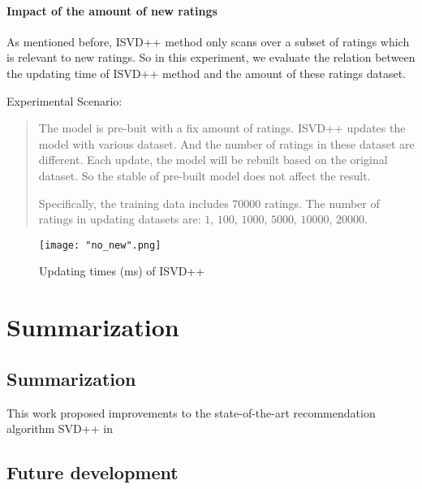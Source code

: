 \documentclass[oneside,13pt]{extreport}
\begin{document}
\subsubsection{Impact of the amount of new ratings}
As mentioned before, ISVD++ method only scans over a subset of ratings which is relevant to new ratings. So in this experiment, we evaluate the relation between the updating time of ISVD++ method and the amount of these ratings dataset.
 
Experimental Scenario: 
\begin{quote}
The model is pre-buit with a fix amount of ratings. ISVD++ updates the model with various dataset. And the number of ratings in these dataset are different. Each update, the model will be rebuilt based on the original dataset. So the stable of pre-built model does not affect the result. 

Specifically, the training data includes $70000$ ratings. The number of ratings in updating datasets are: $1$, $100$, $1000$, $5000$, $10000$, $20000$.
\end{quote}


\begin{figure}[h!]
    \centering
    \texttt{[image: "no\_new".png]} 
    \caption{Updating times (ms) of ISVD++}
    \label{fig:train_timeISVD++_impact_2}
\end{figure}

\chapter{Summarization}
\label{Summarization}
\section{Summarization}
This work proposed improvements to the state-of-the-art recommendation algorithm SVD++ in 
\section{Future development}
\label{future_work}


\vfill
{}
\end{document}
